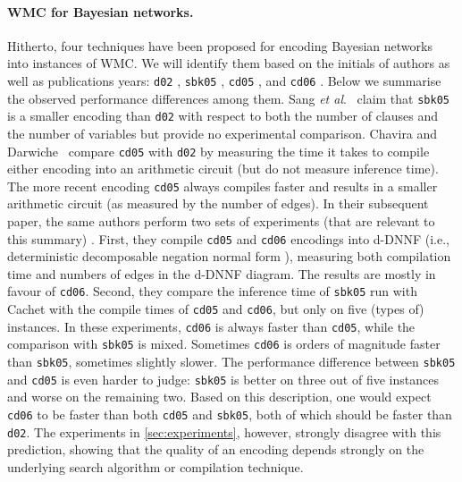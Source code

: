 \documentclass{article}
\newcommand{\etal}{\textit{et al}.}
\begin{document}
\paragraph{WMC for Bayesian networks.} Hitherto, four techniques have been
proposed for encoding Bayesian networks into instances of WMC. We will identify
them based on the initials of authors as well as publications years:
\texttt{d02} \cite{DBLP:conf/kr/Darwiche02}, \texttt{sbk05}
\cite{DBLP:conf/aaai/SangBK05}, \texttt{cd05} \cite{DBLP:conf/ijcai/ChaviraD05},
and \texttt{cd06} \cite{DBLP:conf/sat/ChaviraD06}. Below we summarise the
observed performance differences among them. Sang
\etal{}~ claim that \texttt{sbk05} is a
smaller encoding than \texttt{d02} with respect to both the number of clauses
and the number of variables but provide no experimental comparison. Chavira and
Darwiche~ compare \texttt{cd05} with
\texttt{d02} by measuring the time it takes to compile either encoding into an
arithmetic circuit (but do not measure inference time). The more recent encoding
\texttt{cd05} always compiles faster and results in a smaller arithmetic circuit
(as measured by the number of edges). In their subsequent paper, the same
authors perform two sets of experiments (that are relevant to this summary)
\cite{DBLP:conf/sat/ChaviraD06}. First, they compile \texttt{cd05} and
\texttt{cd06} encodings into d-DNNF (i.e., deterministic decomposable negation
normal form \cite{DBLP:journals/jancl/Darwiche01}), measuring both compilation
time and numbers of edges in the d-DNNF diagram. The results are mostly in
favour of \texttt{cd06}. Second, they compare the inference time of
\texttt{sbk05} run with Cachet \cite{DBLP:conf/sat/SangBBKP04} with the compile
times of \texttt{cd05} and \texttt{cd06}, but only on five (types of) instances.
In these experiments, \texttt{cd06} is always faster than \texttt{cd05}, while
the comparison with \texttt{sbk05} is mixed. Sometimes \texttt{cd06} is orders
of magnitude faster than \texttt{sbk05}, sometimes slightly slower. The
performance difference between \texttt{sbk05} and \texttt{cd05} is even harder
to judge: \texttt{sbk05} is better on three out of five instances and worse on
the remaining two. Based on this description, one would expect \texttt{cd06} to
be faster than both \texttt{cd05} and \texttt{sbk05}, both of which should be
faster than \texttt{d02}. The experiments in \cref{sec:experiments}, however,
strongly disagree with this prediction, showing that the quality of an encoding
depends strongly on the underlying search algorithm or compilation technique.
\end{document}
